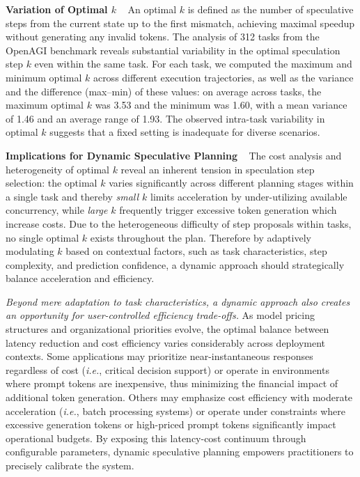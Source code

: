 \noindent \textbf{Variation of Optimal $k$} ~ An optimal $k$ is defined as the number of speculative steps from the current state up to the first mismatch, achieving maximal speedup without generating any invalid tokens. The analysis of 312 tasks from the OpenAGI benchmark reveals substantial variability in the optimal speculation step $k$ even within the same task. For each task, we computed the maximum and minimum optimal $k$ across different execution trajectories, as well as the variance and the difference (max–min) of these values: on average across tasks, the maximum optimal $k$ was 3.53 and the minimum was 1.60, with a mean variance of 1.46 and an average range of 1.93. The observed intra-task variability in optimal $k$ suggests that a fixed setting is inadequate for diverse scenarios. 

\textbf{Implications for Dynamic Speculative Planning} ~ The cost analysis and heterogeneity of optimal $k$ reveal an inherent tension in speculation step selection: the optimal $k$ varies significantly across different planning stages within a single task and thereby \textit{small $k$} limits acceleration by under-utilizing available concurrency, while \textit{large $k$} frequently trigger excessive token generation which increase costs. Due to the heterogeneous difficulty of step proposals within tasks, no single optimal $k$ exists throughout the plan.
Therefore by adaptively modulating $k$ based on contextual factors, such as task characteristics, step complexity, and prediction confidence, a dynamic approach should strategically balance acceleration and efficiency. 

\textit{Beyond mere adaptation to task characteristics, a dynamic approach also creates an opportunity for user-controlled efficiency trade-offs.} As model pricing structures and organizational priorities evolve, the optimal balance between latency reduction and cost efficiency varies considerably across deployment contexts. Some applications may prioritize near-instantaneous responses regardless of cost (\emph{i.e.}, critical decision support) or operate in environments where prompt tokens are inexpensive, thus minimizing the financial impact of additional token generation. Others may emphasize cost efficiency with moderate acceleration (\emph{i.e.}, batch processing systems) or operate under constraints where excessive generation tokens or high-priced prompt tokens significantly impact operational budgets. By exposing this latency-cost continuum through configurable parameters, dynamic speculative planning empowers practitioners to precisely calibrate the system.
